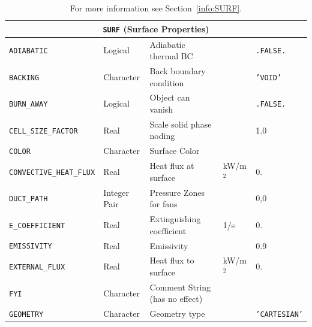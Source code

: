 \documentclass[11pt]{book}
\newcommand{\ct}{\tt\small}
\begin{document}
\begin{longtable}{|l|l|l|l|l|}
\caption[  ]{For more information see Section~\ref{info:SURF}.}
\label{tbl:SURF} \\
\hline
\multicolumn{5}{|c|}{{\ct SURF} (Surface Properties)} \\ \hline \hline
{\ct ADIABATIC}                       & Logical         & Adiabatic thermal BC              &                     & {\ct .FALSE.}           \\ \hline
{\ct BACKING}                         & Character       & Back boundary condition           &                     & {\ct 'VOID'}            \\ \hline
{\ct BURN\_AWAY}                      & Logical         & Object can vanish                 &                     & {\ct .FALSE.}           \\ \hline
{\ct CELL\_SIZE\_FACTOR}              & Real            & Scale solid phase noding          &                     & 1.0                     \\ \hline
{\ct COLOR    }                       & Character       & Surface Color                     &                     &                         \\ \hline
{\ct CONVECTIVE\_HEAT\_FLUX}          & Real            & Heat flux at surface              & kW/m$^2$            & 0.                      \\ \hline
{\ct DUCT\_PATH}                      & Integer Pair    & Pressure Zones for fans           &                     & 0,0                     \\ \hline
{\ct E\_COEFFICIENT}                  & Real            & Extinguishing coefficient         & 1/s                 & 0.                      \\ \hline
{\ct EMISSIVITY}                      & Real            & Emissivity                        &                     & 0.9                     \\ \hline
{\ct EXTERNAL\_FLUX}                  & Real            & Heat flux to surface              & kW/m$^2$            & 0.                      \\ \hline
{\ct FYI}                             & Character       & Comment String (has no effect)    &                     &                         \\ \hline
{\ct GEOMETRY}                        & Character       & Geometry type                     &                     & {\ct 'CARTESIAN'}       \\ \hline

\end{longtable}
\end{document}
